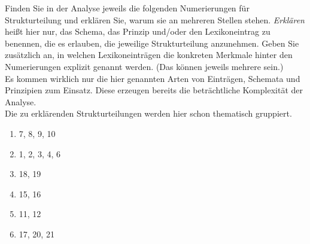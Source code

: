 \documentclass[10pt,a3paper]{article}
\begin{document}
\noindent Finden Sie in der Analyse jeweils die folgenden Numerierungen für Strukturteilung und erklären Sie, warum sie an mehreren Stellen stehen.
\textit{Erklären} heißt hier nur, das Schema, das Prinzip und\slash oder den Lexikoneintrag zu benennen, die es erlauben, die jeweilige Strukturteilung anzunehmen.
Geben Sie zusätzlich an, in welchen Lexikoneinträgen die konkreten Merkmale hinter den Numerierungen explizit genannt werden.
(Das können jeweils mehrere sein.)\\

\noindent Es kommen wirklich nur die hier genannten Arten von Einträgen, Schemata und Prinzipien zum Einsatz.
Diese erzeugen bereits die beträchtliche Komplexität der Analyse.\\

\noindent Die zu erklärenden Strukturteilungen werden hier schon thematisch gruppiert.

\begin{enumerate}
  \item 7, 8, 9, 10
  \item 1, 2, 3, 4, 6
  \item 18, 19
  \item 15, 16
  \item 11, 12
  \item 17, 20, 21
\end{enumerate}
\end{document}
